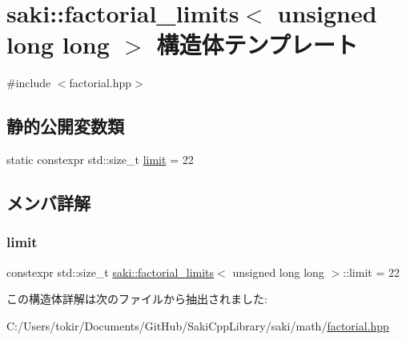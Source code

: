 \hypertarget{structsaki_1_1factorial__limits_3_01unsigned_01long_01long_01_4}{}\section{saki\+:\+:factorial\+\_\+limits$<$ unsigned long long $>$ 構造体テンプレート}
\label{structsaki_1_1factorial__limits_3_01unsigned_01long_01long_01_4}


{\ttfamily \#include $<$factorial.\+hpp$>$}

\subsection*{静的公開変数類}
\begin{DoxyCompactItemize}
\item 
static constexpr std\+::size\+\_\+t \mbox{\hyperlink{structsaki_1_1factorial__limits_3_01unsigned_01long_01long_01_4_a14d4262bd332822e739948e6a32394c6}{limit}} = 22
\end{DoxyCompactItemize}


\subsection{メンバ詳解}
\mbox{\label{structsaki_1_1factorial__limits_3_01unsigned_01long_01long_01_4_a14d4262bd332822e739948e6a32394c6}} 
\subsubsection{\texorpdfstring{limit}{limit}}
{\footnotesize\ttfamily constexpr std\+::size\+\_\+t \mbox{\hyperlink{structsaki_1_1factorial__limits}{saki\+::factorial\+\_\+limits}}$<$ unsigned long long $>$\+::limit = 22\hspace{0.3cm}{\ttfamily [static]}}



この構造体詳解は次のファイルから抽出されました\+:\begin{DoxyCompactItemize}
\item 
C\+:/\+Users/tokir/\+Documents/\+Git\+Hub/\+Saki\+Cpp\+Library/saki/math/\mbox{\hyperlink{factorial_8hpp}{factorial.\+hpp}}\end{DoxyCompactItemize}
